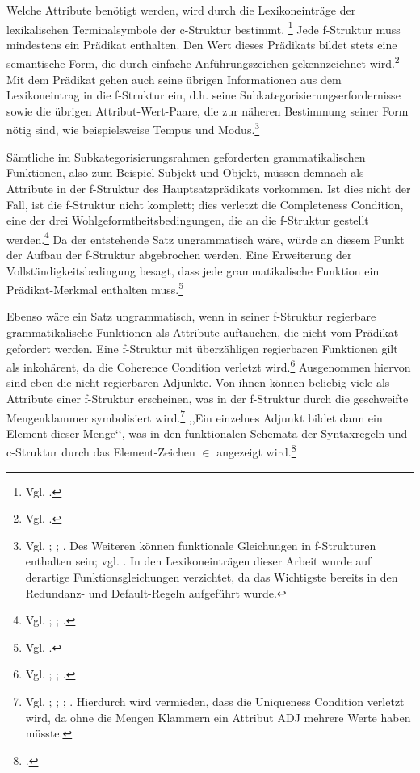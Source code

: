 \documentclass[12pt,a4paper]{article}
\begin{document}
Welche Attribute benötigt werden, wird durch die Lexikoneinträge der lexikalischen Terminalsymbole der c-Struktur bestimmt. \footnote{Vgl. \cite[13; 23]{Rohrer}.} Jede f-Struktur muss mindestens ein Prädikat enthalten. Den Wert dieses Prädikats bildet stets eine semantische Form, die durch einfache Anführungszeichen gekennzeichnet wird.\footnote{Vgl. \cite[8]{Skript}.} Mit dem Prädikat gehen auch seine übrigen Informationen aus dem Lexikoneintrag in die f-Struktur ein, d.h. seine Subkategorisierungserfordernisse sowie die übrigen Attribut-Wert-Paare, die zur näheren Bestimmung seiner Form nötig sind, wie beispielsweise Tempus und Modus.\footnote{Vgl. \cite[23; 28-9]{Rohrer}; \cite[7; 9]{Skript}; \cite[7]{Dal}. Des Weiteren können funktionale Gleichungen in f-Strukturen enthalten sein; vgl. \cite[21]{Rohrer}. In den Lexikoneinträgen dieser Arbeit wurde auf derartige Funktionsgleichungen verzichtet, da das Wichtigste bereits in den Redundanz- und Default-Regeln aufgeführt wurde.} 

Sämtliche im Subkategorisierungsrahmen geforderten grammatikalischen Funktionen, also zum Beispiel Subjekt und Objekt, müssen demnach als Attribute in der f-Struktur des Hauptsatzprädikats vorkommen. Ist dies nicht der Fall, ist die f-Struktur nicht komplett; dies verletzt die Completeness Condition, eine der drei Wohlgeformtheitsbedingungen, die an die f-Struktur gestellt werden.\footnote{Vgl. \cite[58-9]{Falk}; \cite[28]{Rohrer}; \cite[19-20]{Skript}.} Da der entstehende Satz ungrammatisch wäre, würde an diesem Punkt der Aufbau der f-Struktur abgebrochen werden. Eine Erweiterung der Vollständigkeitsbedingung besagt, dass jede grammatikalische Funktion ein Prädikat-Merkmal enthalten muss.\footnote{Vgl. \cite[61]{Falk}.}

Ebenso wäre ein Satz ungrammatisch, wenn in seiner f-Struktur regierbare grammatikalische Funktionen als Attribute auftauchen, die nicht vom Prädikat gefordert werden. Eine f-Struktur mit überzähligen regierbaren Funktionen gilt als inkohärent, da die Coherence Condition verletzt wird.\footnote{Vgl. \cite[59-62]{Falk}; \cite[29; 39]{Rohrer}; \cite[20]{Skript}.} Ausgenommen hiervon sind eben die nicht-regierbaren Adjunkte. Von ihnen können beliebig viele als Attribute einer f-Struktur erscheinen, was in der f-Struktur durch die geschweifte Mengenklammer symbolisiert wird.\footnote{Vgl. \cite[61; 72]{Falk}; \cite[12]{Dal}; \cite[28]{Rohrer}; \cite[38-40]{Skript}. Hierdurch wird vermieden, dass die Uniqueness Condition verletzt wird, da ohne die Mengen Klammern ein Attribut ADJ mehrere Werte haben müsste.} ,,Ein einzelnes Adjunkt bildet dann ein Element dieser Menge‘‘, was in den funktionalen Schemata der Syntaxregeln und c-Struktur durch das Element-Zeichen $\in$ angezeigt wird.\footnote{ \cite[39]{Skript}.}
\end{document}
